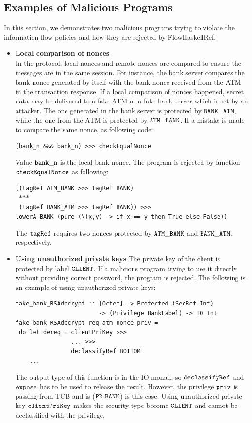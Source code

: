 \documentclass{report}
\newcommand{\co}[1]{$\cod{#1}$}
\begin{document}
\subsection{Examples of Malicious Programs}
In this section, we demonstrates two malicious programs trying to violate the information-flow policies and
how they are rejected by FlowHaskellRef.
\begin{itemize}
\item \textbf{Local comparison of nonces} \\
      In the protocol, local nonces and remote nonces are compared to ensure the messages are in the same 
      session. For instance, the bank server compares the bank nonce generated by itself with the bank nonce
      received from the ATM in the transaction response. 
      If a local comparison of nonces happened, secret data may be delivered to a fake ATM or a fake bank server
      which is set by an attacker. 
      The one generated in the bank server is protected by
      \co{BANK\_ATM}, while the one from the ATM is protected by \co{ATM\_BANK}. If a mistake is made to 
      compare the same nonce, as following code:
\begin{Verbatim}[fontsize=\small]
(bank_n &&& bank_n) >>> checkEqualNonce 
\end{Verbatim}
      Value \co{bank\_n} is the local bank nonce. The program is rejected by function 
      \co{checkEqualNonce} as following:
\begin{Verbatim}[fontsize=\small]
((tagRef ATM_BANK >>> tagRef BANK) 
 *** 
 (tagRef BANK_ATM >>> tagRef BANK)) >>>
lowerA BANK (pure (\(x,y) -> if x == y then True else False))
\end{Verbatim}
      The \co{tagRef} requires two nonces protected by \co{ATM\_BANK} and \co{BANK\_ATM}, respectively.

\item \textbf{Using unauthorized private keys}
      The private key of the client is protected by label \co{CLIENT}. If a malicious program trying to
      use it directly without providing correct password, the program is rejected. The following is an
      example of using unauthorized private keys:
\begin{Verbatim}[fontsize=\small]
fake_bank_RSAdecrypt :: [Octet] -> Protected (SecRef Int)
                        -> (Privilege BankLabel) -> IO Int
fake_bank_RSAdecrypt req atm_nonce priv =
 do let dereq = clientPriKey >>> 
                ... >>>
                declassifyRef BOTTOM
    ...
\end{Verbatim}
      The output type of this function is in the IO monad, so \co{declassifyRef} and \co{expose} has to 
      be used to release the result. However, the privilege \co{priv} is passing from TCB and is
      (\co{PR} \co{BANK}) is this case. Using unauthorized private key \co{clientPriKey} makes the
      security type become \co{CLIENT} and cannot be declassified with the privilege.
\end{itemize}
\end{document}
